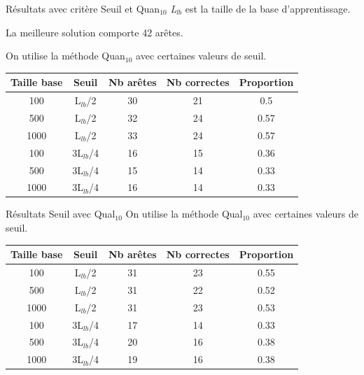 \documentclass{beamer}
\begin{document}
\begin{frame}{Résultats avec critère Seuil et Quan$_{10}$}
\emph{L$_{lb}$} est la taille de la base d'apprentissage. 

La meilleure solution comporte 42 arêtes.

On utilise la méthode Quan$_{10}$ avec certaines valeurs de seuil.

\begin{tabular}{|c|c|c|c|c|}
   \hline
   Taille base & Seuil & Nb arêtes & Nb correctes & Proportion\\
   \hline
   100 & L$_{lb}$/2 & 30 & 21 & 0.5  \\
   \hline
   500 & L$_{lb}$/2 & 32 & 24 & 0.57  \\
   \hline
   1000 & L$_{lb}$/2 & 33 & 24 & 0.57  \\
   \hline
   \hline
   100 & 3L$_{lb}$/4 & 16 & 15 & 0.36  \\
   \hline
   500 & 3L$_{lb}$/4 & 15 & 14 & 0.33  \\
   \hline
   1000 & 3L$_{lb}$/4 & 16 & 14 & 0.33  \\
   \hline
\end{tabular}


\end{frame}

\begin{frame}{Résultats Seuil avec Qual$_{10}$}
On utilise la méthode Qual$_{10}$ avec certaines valeurs de seuil.
\begin{tabular}{|c|c|c|c|c|}
   \hline
   Taille base & Seuil & Nb arêtes & Nb correctes & Proportion\\
   \hline
   100 & L$_{lb}$/2 & 31 & 23 & 0.55  \\
   \hline
   500 & L$_{lb}$/2 & 31 & 22 & 0.52  \\
   \hline
   1000 & L$_{lb}$/2 & 31 & 23 & 0.53  \\
   \hline
   \hline
   100 & 3L$_{lb}$/4 & 17 & 14 & 0.33  \\
   \hline
   500 & 3L$_{lb}$/4 & 20 & 16 & 0.38  \\
   \hline
   1000 & 3L$_{lb}$/4 & 19 & 16 & 0.38  \\
   \hline
\end{tabular}
\end{frame}
\end{document}
